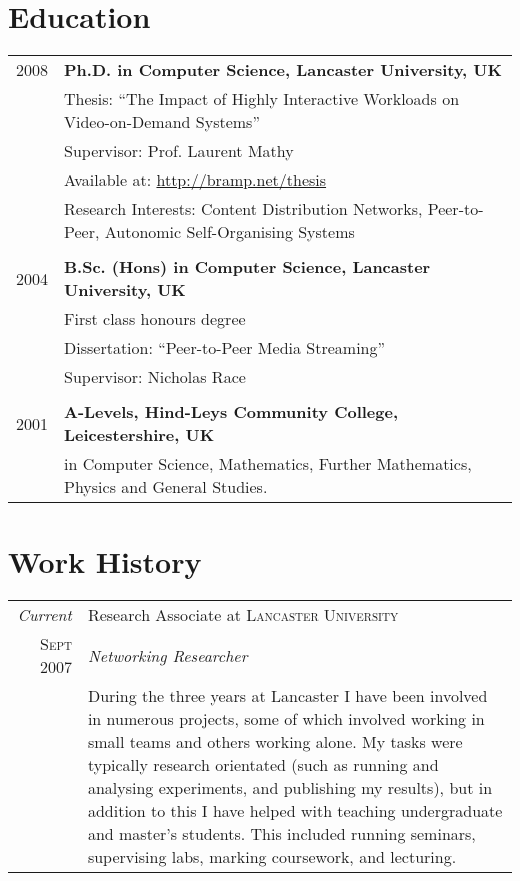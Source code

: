 \documentclass[a4paper,10pt]{article}
\begin{document}
\section{Education}
\begin{tabular}{rp{14cm}}	
 \textsc{2008} & \textbf{Ph.D. in Computer Science, Lancaster University, UK}\\
& Thesis: ``The Impact of Highly Interactive Workloads on Video-on-Demand Systems''\\
& Supervisor: Prof. Laurent Mathy\\
& Available at: \href{http://bramp.net/thesis}{http://bramp.net/thesis}\\
& Research Interests: Content Distribution Networks, Peer-to-Peer, Autonomic Self-Organising Systems\\
&\\

\textsc{2004} & \textbf{B.Sc. (Hons) in Computer Science, Lancaster University, UK}\\
& First class honours degree\\
& Dissertation: ``Peer-to-Peer Media Streaming''\\
& Supervisor: Nicholas Race\\
&\\

\textsc{2001} & \textbf{A-Levels, Hind-Leys Community College, Leicestershire, UK}\\
& in Computer Science, Mathematics, Further Mathematics, Physics and General Studies.\\

\end{tabular}

\section{Work History}
\begin{tabular}{r|p{13.5cm}}
 \emph{Current} & Research Associate at \textsc{Lancaster University} \\
 \textsc{Sept 2007} & \emph{Networking Researcher}\\
& During the three years at Lancaster I have been involved in numerous projects, some of which involved working in small teams and others working alone. My tasks were typically research orientated (such as running and analysing experiments, and publishing my results), but in addition to this I have helped with teaching undergraduate and master's students. This included running seminars, supervising labs, marking coursework, and lecturing.\\


\end{tabular}
\end{document}
